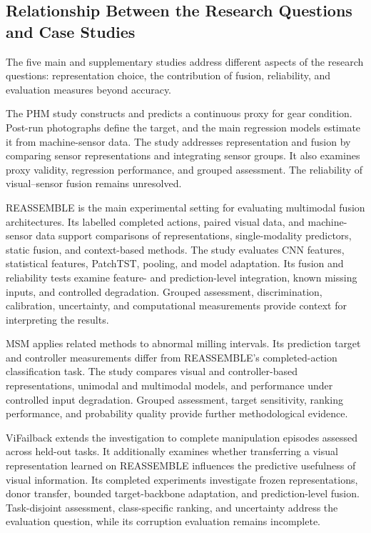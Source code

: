\subsection{Relationship Between the Research Questions and Case Studies}

The five main and supplementary studies address different aspects of the research questions: representation choice, the contribution of fusion, reliability, and evaluation measures beyond accuracy.

The PHM study constructs and predicts a continuous proxy for gear condition. Post-run photographs define the target, and the main regression models estimate it from machine-sensor data. The study addresses representation and fusion by comparing sensor representations and integrating sensor groups. It also examines proxy validity, regression performance, and grouped assessment. The reliability of visual–sensor fusion remains unresolved.

REASSEMBLE is the main experimental setting for evaluating multimodal fusion architectures. Its labelled completed actions, paired visual data, and machine-sensor data support comparisons of representations, single-modality predictors, static fusion, and context-based methods. The study evaluates CNN features, statistical features, PatchTST, pooling, and model adaptation. Its fusion and reliability tests examine feature- and prediction-level integration, known missing inputs, and controlled degradation. Grouped assessment, discrimination, calibration, uncertainty, and computational measurements provide context for interpreting the results.

MSM applies related methods to abnormal milling intervals. Its prediction target and controller measurements differ from REASSEMBLE’s completed-action classification task. The study compares visual and controller-based representations, unimodal and multimodal models, and performance under controlled input degradation. Grouped assessment, target sensitivity, ranking performance, and probability quality provide further methodological evidence.

ViFailback extends the investigation to complete manipulation episodes assessed across held-out tasks. It additionally examines whether transferring a visual representation learned on REASSEMBLE influences the predictive usefulness of visual information. Its completed experiments investigate frozen representations, donor transfer, bounded target-backbone adaptation, and prediction-level fusion. Task-disjoint assessment, class-specific ranking, and uncertainty address the evaluation question, while its corruption evaluation remains incomplete.

